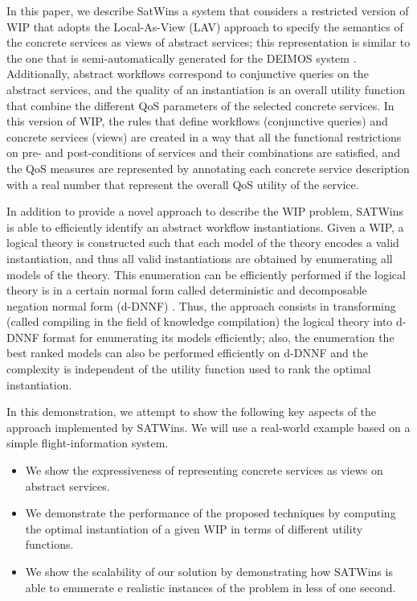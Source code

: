 \documentclass{llncs}
\begin{document}
In this paper, we describe SatWins a system that considers
 a restricted version of WIP that adopts
the Local-As-View (LAV) approach \cite{levy:bucket} to specify the semantics of the concrete services as views of abstract services; this representation is similar to the
one that is semi-automatically generated for the DEIMOS system
\cite{AmbiteISWC09}. Additionally,  abstract workflows correspond  to conjunctive
queries on the abstract services, and  the quality
of an instantiation is an overall utility function that combine the
different QoS parameters of the selected concrete services.
In this version of WIP, the rules that define workflows (conjunctive queries)
and concrete services (views) are created in a way that all the 
functional restrictions on pre- and post-conditions of services
and their combinations are satisfied, and the QoS measures are
represented by annotating each concrete service description with
a real number that represent the overall QoS utility of the service.

In addition to provide a novel approach to describe the WIP problem, SATWins is able to  efficiently identify an abstract workflow instantiations. 
Given a WIP, a logical theory is constructed such that each model of
the theory encodes a valid instantiation, and thus all valid instantiations
are obtained by enumerating all models of the theory. This enumeration
can be efficiently performed if the logical theory is in a certain 
normal form called deterministic and decomposable negation normal
form (d-DNNF) \cite{darwiche:d-dnnfs}. Thus, the approach consists in
transforming (called compiling in the field of knowledge compilation)
the logical theory into d-DNNF format for enumerating its models efficiently; also, the  enumeration 
the best ranked models can also be performed efficiently on d-DNNF and the complexity is independent of the utility function used to rank the optimal instantiation.

In this demonstration, we  attempt to show the following key aspects of the approach implemented by SATWins. We will use a real-world example based on a simple flight-information system.
\begin{itemize}
\item We show the expressiveness of representing concrete services as views on abstract services.
\item We demonstrate the performance of the proposed techniques by computing the optimal instantiation of a given WIP in terms of different utility functions.  
\item We show the scalability of our solution by demonstrating how SATWins is able to enumerate e realistic instances of the problem in less of one second.
\end{itemize}  
 
\end{document}
